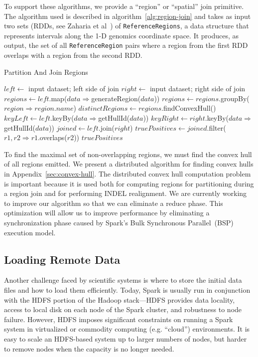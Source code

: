 \documentclass{acm_proc_article-sp}
\begin{document}
To support these algorithms, we provide a ``region'' or ``spatial'' join primitive. The algorithm used is described
in algorithm~\ref{alg:region-join} and takes as input two sets (RDDs, see Zaharia et al~\cite{zaharia12}) of
\texttt{ReferenceRegions}, a data structure that represents intervals along the 1-D genomics coordinate
space. It produces, as output, the set of all \texttt{ReferenceRegion} pairs where a region from the first RDD
overlaps with a region from the second RDD.

\begin{algorithm}
\caption{Partition And Join Regions}
\label{alg:region-join}
\begin{algorithmic}
\STATE $left \leftarrow$ input dataset; left side of join
\STATE $right \leftarrow$ input dataset; right side of join
\STATE $regions \leftarrow left$.map($data \Rightarrow $generateRegion($data$))
\STATE $regions \leftarrow regions$.groupBy($region \Rightarrow region$.$name$)
\STATE $distinctRegions \leftarrow regions$.findConvexHull()
\STATE $keyLeft \leftarrow left$.keyBy($data \Rightarrow $getHullId($data$))
\STATE $keyRight \leftarrow right$.keyBy($data \Rightarrow $getHullId($data$))
\STATE $joined \leftarrow left$.join($right$)
\STATE $truePositives \leftarrow joined$.filter($r1, r2 \Rightarrow r1$.overlaps($r2$))
\RETURN $truePositives$
\end{algorithmic}
\end{algorithm}

To find the maximal set of non-overlapping regions, we must find the convex hull of all regions emitted.
We present a distributed algorithm for finding convex hulls in Appendix~\ref{sec:convex-hull}. The
distributed convex hull computation problem is important because it is used both for computing regions
for partitioning during a region join and for performing INDEL realignment. We are currently working to
improve our algorithm so that we can eliminate a reduce phase. This optimization will allow us to improve
performance by eliminating a synchronization phase caused by Spark's Bulk Synchronous
Parallel~(BSP) execution model.

\subsection{Loading Remote Data}
\label{sec:loading-remote-data}

Another challenge faced by scientific systems is where to store the initial data files and how to load them
efficiently. Today, Spark is usually run in conjunction with the HDFS portion of the Hadoop stack---HDFS
provides data locality, access to local disk on each node of the Spark cluster, and robustness to node
failure. However, HDFS imposes significant constraints on running a Spark system in virtualized or
commodity computing (e.g. ``cloud'') environments.  It is easy to scale an HDFS-based system up to
larger numbers of nodes, but harder to remove nodes when the capacity is no longer needed.  
\end{document}
